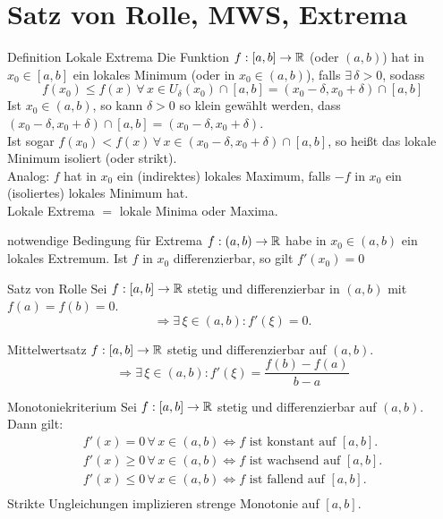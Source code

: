 \documentclass[main.tex]{subfiles}
\begin{document}
\section*{Satz von Rolle, MWS, Extrema}
\begin{karte}{Definition Lokale Extrema}
    Die Funktion \( f : [a,b] \rightarrow \mathbb{R} \) (oder \( (a,b) \))
    hat in \( x_0 \in [a,b] \) ein lokales Minimum (oder in 
    \( x_0 \in (a,b) \)), falls \( \exists \, \delta > 0 \), 
    sodass 
    \[ f(x_0) \leq f(x) \, \forall \, x \in U_\delta(x_0)
    \cap [a,b] = (x_0 - \delta, x_0 + \delta) \cap [a,b] \]
    Ist \( x_0 \in (a,b) \), so kann \( \delta > 0 \) so klein 
    gewählt werden, dass \( (x_0 - \delta, x_0 + \delta) 
    \cap [a,b] = (x_0 - \delta, x_0 + \delta) \). \\
    Ist sogar \( f(x_0) < f(x) \,\forall \, x \in 
    (x_0 - \delta, x_0 + \delta) \cap [a,b] \), so heißt 
    das lokale Minimum isoliert (oder strikt).\\
    Analog: \( f \) hat in \( x_0 \) ein (indirektes) lokales 
    Maximum, falls \(-f\) in \(x_0\) ein (isoliertes) lokales 
    Minimum hat.\\
    Lokale Extrema \(=\) lokale Minima oder Maxima.
\end{karte}
\begin{karte}{notwendige Bedingung für Extrema}
    \( f: (a,b) \rightarrow \mathbb{R} \) habe in \(x_0 \in (a,b) \) 
    ein lokales Extremum. Ist \(f\) in \(x_0\) differenzierbar, 
    so gilt \( f'(x_0) = 0 \)
\end{karte}
\begin{karte}{Satz von Rolle}
    Sei \( f: [a,b] \rightarrow \mathbb{R} \) stetig und differenzierbar 
    in \( (a,b) \) mit \( f(a) = f(b) = 0 \).
    \[ \Rightarrow \exists \, \xi \in (a,b) : f'(\xi) = 0. \]
\end{karte}
\begin{karte}{Mittelwertsatz}
    \( f: [a, b] \rightarrow \mathbb{R} \) stetig und differenzierbar 
    auf \((a,b)\).
    \[ \Rightarrow \exists \, \xi \in (a,b): f'(\xi) = \frac{f(b)-f(a)}{b-a} \]
\end{karte}
\begin{karte}{Monotoniekriterium}
    Sei \( f : [a,b] \rightarrow \mathbb{R} \) stetig und differenzierbar 
    auf \( (a,b) \).\\
    Dann gilt:
    \begin{align*}
        f'(x) = 0 \,\forall \, x \in (a,b) \Leftrightarrow 
        f \text{ ist konstant auf } [a,b].\\
        f'(x) \geq 0 \,\forall \, x \in (a,b) \Leftrightarrow 
        f \text{ ist wachsend auf } [a,b].\\ 
        f'(x) \leq 0 \,\forall \, x \in (a,b) \Leftrightarrow 
        f \text{ ist fallend auf } [a,b].\\
    \end{align*}
    Strikte Ungleichungen implizieren strenge Monotonie auf 
    \( [a,b] \).
\end{karte}
\end{document}
